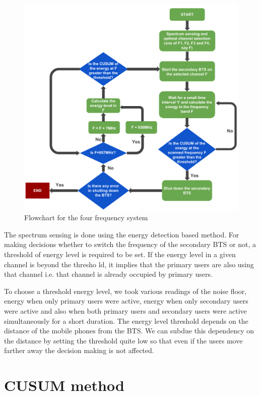 \begin{figure}
\centering
\includegraphics[width=1\textwidth]{../images/freqSys4}
\caption[Four frequency system]{Flowchart for  the four frequency system}
\label{freqSys4}
\end{figure}

The spectrum sensing is done using the energy detection based method. For 
making decisions whether to switch the frequency of the secondary BTS or not, 
a threshold of energy level is required to be set. If the energy level in a 
given channel is beyond the thresho ld, it implies that the primary users are
also using that channel i.e. that channel is already occupied by primary 
users.

To choose a threshold energy level, we took various readings of the noise 
floor, energy when only primary users were active, energy when only secondary 
users were active and also when both primary users and secondary users were 
active simultaneously for a short duration. The energy level threshold depends
on the distance of the mobile phones from the BTS. We can subdue this 
dependency on the distance by setting the threshold quite low so that even if
the users move farther away the decision making is not affected.

\section{CUSUM method}


